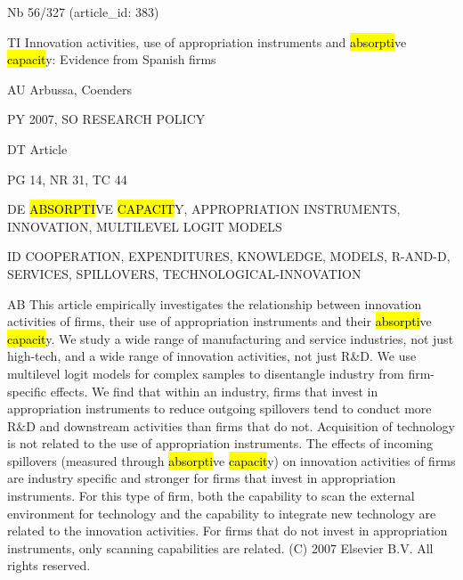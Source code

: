 \documentclass[a4paper]{article}
\begin{document}
\vspace*{-2cm}
Nb \tabto{0cm}56/327 (article\_id: 383)\par
TI \tabto{0cm}Innovation activities, use of appropriation instruments and \hl{absorpti}ve \hl{capacit}y: Evidence from Spanish firms\par
AU \tabto{0cm}Arbussa, Coenders\par
PY \tabto{0cm}2007, SO RESEARCH POLICY\par
DT \tabto{0cm}Article\par
PG \tabto{0cm}14, NR 31, TC 44\par
DE \tabto{0cm}\hl{ABSORPTI}VE \hl{CAPACIT}Y, APPROPRIATION INSTRUMENTS, INNOVATION, MULTILEVEL LOGIT MODELS\par
ID \tabto{0cm}COOPERATION, EXPENDITURES, KNOWLEDGE, MODELS, R-AND-D, SERVICES, SPILLOVERS, TECHNOLOGICAL-INNOVATION\par
AB \tabto{0cm}This article empirically investigates the relationship between innovation activities of firms, their use of appropriation instruments and their \hl{absorpti}ve \hl{capacit}y. We study a wide range of manufacturing and service industries, not just high-tech, and a wide range of innovation activities, not just R\&D. We use multilevel logit models for complex samples to disentangle industry from firm-specific effects. We find that within an industry, firms that invest in appropriation instruments to reduce outgoing spillovers tend to conduct more R\&D and downstream activities than firms that do not. Acquisition of technology is not related to the use of appropriation instruments. The effects of incoming spillovers (measured through \hl{absorpti}ve \hl{capacit}y) on innovation activities of firms are industry specific and stronger for firms that invest in appropriation instruments. For this type of firm, both the capability to scan the external environment for technology and the capability to integrate new technology are related to the innovation activities. For firms that do not invest in appropriation instruments, only scanning capabilities are related. (C) 2007 Elsevier B.V. All rights reserved.\par
\clearpage
\end{document}
